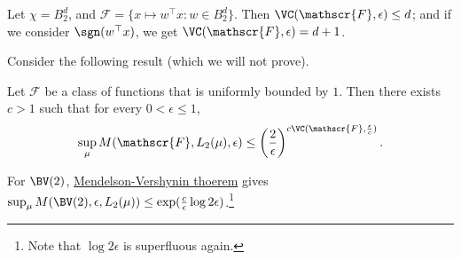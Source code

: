 \begin{eg}\label{eg:lec16}
	Let \(\chi = B_2^d\), and \(\mathscr{F} = \{ x \mapsto w^{\top} x \colon w\in B_2^d \} \). Then \(\VC(\mathscr{F} , \epsilon ) \leq d\); and if we consider \(\sgn (w^{\top} x)\), we get \(\VC(\mathscr{F} , \epsilon ) = d+1\).
\end{eg}

Consider the following result (which we will not prove).

\begin{theorem}\label{thm:Mendelson-Vershynin}
	Let \(\mathscr{F} \) be a class of functions that is uniformly bounded by \(1\). Then there exists \(c > 1\) such that for every \(0 < \epsilon \leq 1\),
	\[
		\sup _\mu M(\mathscr{F} , L_2(\mu ), \epsilon) \leq \left( \frac{2}{\epsilon } \right) ^{c \VC(\mathscr{F} , \frac{\epsilon}{c})}.
	\]
\end{theorem}

\begin{remark}
	For \(\BV(2) \), \hyperref[thm:Mendelson-Vershynin]{Mendelson-Vershynin thoerem} gives \(\sup _\mu M(\BV(2) , \epsilon , L_2(\mu )) \leq \exp (\frac{c}{\epsilon } \log 2\epsilon )\).\footnote{Note that \(\log 2\epsilon \) is superfluous again.}
\end{remark}